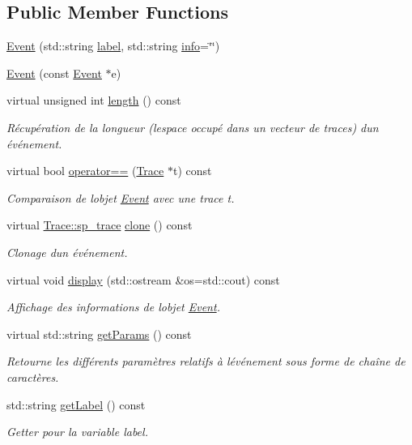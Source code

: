 \subsection*{Public Member Functions}
\begin{DoxyCompactItemize}
\item 
\hyperlink{class_event_a0effe34c8d7cf236f831b6a038ca5d94}{Event} (std\+::string \hyperlink{class_event_a8d9ecffd91cc944bee314f83260713ff}{label}, std\+::string \hyperlink{class_trace_a4835dcfa7da5d4c971e8f7d6860acb09}{info}=\char`\"{}\char`\"{})
\item 
\hyperlink{class_event_af490e691699bb4c74235fc9b224addee}{Event} (const \hyperlink{class_event}{Event} $\ast$e)
\item 
virtual unsigned int \hyperlink{class_event_adc33626b18f2090fba9f58cf0991fdb5}{length} () const 
\begin{DoxyCompactList}\small\item\em Récupération de la longueur (l\textquotesingle{}espace occupé dans un vecteur de traces) d\textquotesingle{}un événement. \end{DoxyCompactList}\item 
virtual bool \hyperlink{class_event_a33edb6d4cfa0dc8040a8a7e9e3e326d9}{operator==} (\hyperlink{class_trace}{Trace} $\ast$t) const 
\begin{DoxyCompactList}\small\item\em Comparaison de l\textquotesingle{}objet \hyperlink{class_event}{Event} avec une trace {\ttfamily t}. \end{DoxyCompactList}\item 
virtual \hyperlink{class_trace_a9c58e523529fc8a03fb6acf3eef86150}{Trace\+::sp\+\_\+trace} \hyperlink{class_event_aafa2022d6600717a9cd6511797548265}{clone} () const 
\begin{DoxyCompactList}\small\item\em Clonage d\textquotesingle{}un événement. \end{DoxyCompactList}\item 
virtual void \hyperlink{class_event_ae5465424aa2d50e2e144eae1d84a7ea9}{display} (std\+::ostream \&os=std\+::cout) const 
\begin{DoxyCompactList}\small\item\em Affichage des informations de l\textquotesingle{}objet \hyperlink{class_event}{Event}. \end{DoxyCompactList}\item 
virtual std\+::string \hyperlink{class_event_aad213c94070547bb727ba369b3460e2a}{get\+Params} () const 
\begin{DoxyCompactList}\small\item\em Retourne les différents paramètres relatifs à l\textquotesingle{}événement sous forme de chaîne de caractères. \end{DoxyCompactList}\item 
std\+::string \hyperlink{class_event_aadab1c703ff3bd4983da917badbb83d4}{get\+Label} () const 
\begin{DoxyCompactList}\small\item\em Getter pour la variable {\ttfamily label}. \end{DoxyCompactList}\end{DoxyCompactItemize}
